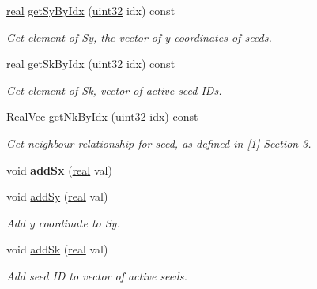 \begin{DoxyCompactItemize}
\mbox{\hyperlink{typedefs_8h_a58a0c7cf2501f4492da833421be92547}{real}} \mbox{\hyperlink{classvd_a0f630fc80e57d3e17ab036f75afde006}{get\+Sy\+By\+Idx}} (\mbox{\hyperlink{typedefs_8h_a8ad23e2333787a214e20a58a284a5a60}{uint32}} idx) const
\begin{DoxyCompactList}\small\item\em Get element of Sy, the vector of y coordinates of seeds. \end{DoxyCompactList}\item 
\mbox{\hyperlink{typedefs_8h_a58a0c7cf2501f4492da833421be92547}{real}} \mbox{\hyperlink{classvd_a4d2c835e7804c4242dce6d411f01ce0a}{get\+Sk\+By\+Idx}} (\mbox{\hyperlink{typedefs_8h_a8ad23e2333787a214e20a58a284a5a60}{uint32}} idx) const
\begin{DoxyCompactList}\small\item\em Get element of Sk, vector of active seed I\+Ds. \end{DoxyCompactList}\item 
\mbox{\hyperlink{typedefs_8h_a84b6d9a0fbb45e01ad4a3aa5667f2992}{Real\+Vec}} \mbox{\hyperlink{classvd_a4d058d2d1d675a741a83776c95b2acfb}{get\+Nk\+By\+Idx}} (\mbox{\hyperlink{typedefs_8h_a8ad23e2333787a214e20a58a284a5a60}{uint32}} idx) const
\begin{DoxyCompactList}\small\item\em Get neighbour relationship for seed, as defined in \mbox{[}1\mbox{]} Section 3. \end{DoxyCompactList}\item 
\mbox{\label{classvd_aa963b629bc4d1a6b52b0df7efae04da3}} 
void {\bfseries add\+Sx} (\mbox{\hyperlink{typedefs_8h_a58a0c7cf2501f4492da833421be92547}{real}} val)
\item 
void \mbox{\hyperlink{classvd_ae15b2741f063cc113aaf7a23199a5efe}{add\+Sy}} (\mbox{\hyperlink{typedefs_8h_a58a0c7cf2501f4492da833421be92547}{real}} val)
\begin{DoxyCompactList}\small\item\em Add y coordinate to Sy. \end{DoxyCompactList}\item 
void \mbox{\hyperlink{classvd_a62112357c953c7dc77a4e3fb46aeaf9d}{add\+Sk}} (\mbox{\hyperlink{typedefs_8h_a58a0c7cf2501f4492da833421be92547}{real}} val)
\begin{DoxyCompactList}\small\item\em Add seed ID to vector of active seeds. \end{DoxyCompactList}\item 

\end{DoxyCompactItemize}
